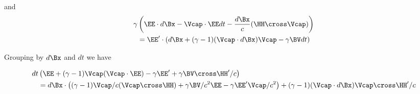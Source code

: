 and
\begin{align*}
\gamma &\left( \EE \cdot d\Bx - 
\Vcap \cdot \EE dt 
-\frac{d\Bx}{c} (\HH \cross \Vcap)
\right) \\
&=
\EE' \cdot \left(d\Bx + (\gamma-1)(\Vcap \cdot d\Bx) \Vcap - \gamma \BV dt\right)
\end{align*}

Grouping by $d\Bx$ and $dt$ we have

\begin{align*}
dt &\left(
\EE 
+ (\gamma-1) \Vcap (\Vcap \cdot \EE)
- \gamma \EE' 
+ \gamma \BV \cross \HH'/c 
\right)
\\
&=
d\Bx \cdot \left(
(\gamma-1) \Vcap/c (\Vcap \cross \HH)
+ \gamma \BV/c^2 \EE 
- \gamma \EE' \Vcap/c^2 
\right)
+ (\gamma-1)(\Vcap \cdot d\Bx) \Vcap \cross \HH'/c
\end{align*}


